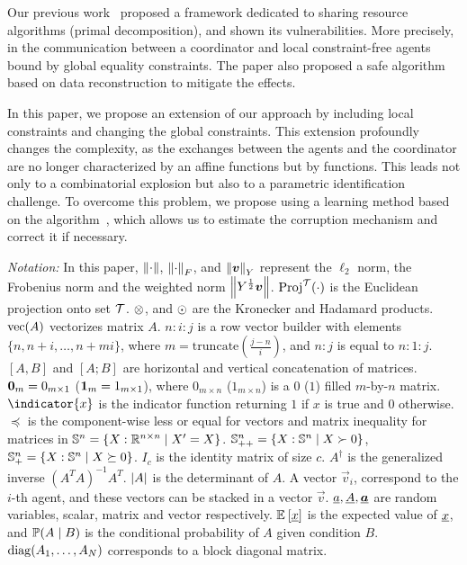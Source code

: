 \documentclass{ifacconf}  %
\begin{document}
Our previous work~\citep{NogueiraEtAl2021} proposed a framework dedicated to
sharing resource algorithms (primal decomposition), and shown its vulnerabilities.
More precisely, \fdi{} in the communication
between a coordinator and local constraint-free agents bound by global equality constraints. The paper also proposed a safe algorithm based on data reconstruction to mitigate the effects.

In this paper, we propose an extension of our approach by including local constraints and changing the global constraints.
This extension profoundly changes the complexity, as the exchanges between the
agents and the coordinator are no longer characterized by an affine functions
but by \pwa{} functions.
This leads not only to a combinatorial explosion but also to a parametric identification challenge.
To overcome this problem, we propose using a learning method based on the \EM{} algorithm~\citep{DempsterEtAl1977}, which allows us to estimate the corruption
mechanism and correct it if necessary.


\emph{Notation:}
In this paper, $\left\lVert\cdot\right\rVert$, $\left\lVert\cdot\right\rVert_{F}$, and $\left\lVert\boldsymbol{v}\right\rVert_{Y}$ represent the $\ell_{2}$ norm, the Frobenius norm and the weighted norm $\left\lVert Y^{\frac{1}{2}}\boldsymbol{v}\right\rVert$.
$\operatorname{Proj}^{\mathcal{T}}(\cdot)$ is the Euclidean projection onto set $\mathcal{T}$.
$\mathbin{\otimes}$, and $\odot$ are the Kronecker and Hadamard products.
$\mathrm{vec} (A)$ vectorizes matrix $A$.
${n\mathbin{:}i\mathbin{:}j}$ is a row vector builder with elements $\{n,n+i,\dots,n+mi\}$, where ${m=\mathrm{truncate}(\frac{j-n}{i})}$, and ${n\mathbin{:}j}$ is equal to ${n\mathbin{:}1\mathbin{:}j}$.
$[A,B]$ and $[A;B]$ are horizontal and vertical concatenation of matrices.
${\mathbf{0}_{m}=0_{m\times 1}}$ (${\mathbf{1}_{m}=1_{m\times 1}}$), where
$0_{m\times n}$ ($1_{m\times n}$) is a $0$ ($1$) filled \mbox{$m$-by-$n$} matrix.
$\indicator{x}$ is the indicator function returning $1$ if $x$ is true and $0$ otherwise.
$\preceq$ is the component-wise less or equal for vectors and matrix inequality for matrices in ${\mathbb{S}^{n}=\{X:\mathbb{R}^{n\times n}\mid X'=X\}}$.
${\mathbb{S}_{++}^{n}=\{X:\mathbb{S}^{n}\mid X\succ 0\}}$, ${\mathbb{S}_{+}^{n}=\{X:\mathbb{S}^{n}\mid X\succeq 0\}}$.
$I_{c}$ is the identity matrix of size $c$.
$A^{\dagger}$ is the generalized inverse ${{(A^{T}A)}^{-1}A^{T}}$.
$|A|$ is the determinant of $A$.
A vector $\vec{v}_{i}$, correspond to the $i$-th agent, and these vectors can be stacked in a vector $\vec{v}$.
$\underline{a},\underline{A},{\underline{\boldsymbol{a}}}$ are random variables, scalar, matrix and vector respectively.
$\mathbb{E}_{}\left[\underline{x}\right]$ is the expected value of $\underline{x}$, and $\mathbb{P}(A \mid B)$ is the conditional probability of $A$ given condition $B$.
${\operatorname{diag}(A_{1},\dots,A_{N})}$ corresponds to a block diagonal matrix.
\end{document}
